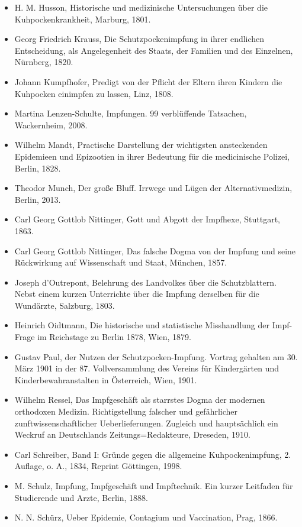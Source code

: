 \documentclass[
    a4paper,
    12pt,
    hyphens,
    chapterprefix=true,
    headheight=33pt,
    footheight=29pt,
    headings=optiontohead,
]{scrartcl}
\begin{document}
{\begin{itemize}
\item{H. M. Husson, Historische und medizinische Untersuchungen über die Kuhpockenkrankheit, Marburg, 1801.}
\item{Georg Friedrich Krauss, Die Schutzpockenimpfung in ihrer endlichen Entscheidung, als Angelegenheit des Staats, der Familien und des Einzelnen, Nürnberg, 1820.}
\item{Johann Kumpfhofer, Predigt von der Pflicht der Eltern ihren Kindern die Kuhpocken einimpfen zu lassen, Linz, 1808.}
\item{Martina Lenzen-Schulte, Impfungen. 99 verblüffende Tatsachen, Wackernheim, 2008.}
\item{Wilhelm Mandt, Practische Darstellung der wichtigsten ansteckenden Epidemieen und Epizootien in ihrer Bedeutung für die medicinische Polizei, Berlin, 1828.}
\item{Theodor Munch, Der große Bluff. Irrwege und Lügen der Alternativmedizin, Berlin, 2013.}
\item{Carl Georg Gottlob Nittinger, Gott und Abgott der Impfhexe, Stuttgart, 1863.}
\item{Carl Georg Gottlob Nittinger, Das falsche Dogma von der Impfung und seine Rückwirkung auf Wissenschaft und Staat, München, 1857.}
\item{Joseph d'Outrepont, Belehrung des Landvolkes über die Schutzblattern. Nebst einem kurzen Unterrichte über die Impfung derselben für die Wundärzte, Salzburg, 1803.}
\item{Heinrich Oidtmann, Die historische und statistische Misshandlung der Impf-Frage im Reichstage zu Berlin 1878, Wien, 1879.}
\item{Gustav Paul, der Nutzen der Schutzpocken-Impfung. Vortrag gehalten am 30. März 1901 in der 87. Vollversammlung des Vereins für Kindergärten und Kinderbewahranstalten in Österreich, Wien, 1901.}
\item{Wilhelm Ressel, Das Impfgeschäft als starrstes Dogma der modernen orthodoxen Medizin. Richtigstellung falscher und gefährlicher zunftwissenschaftlicher Ueberlieferungen. Zugleich und hauptsächlich ein Weckruf an Deutschlands Zeitungs=Redakteure, Dreseden, 1910.}
\item{Carl Schreiber, Band I: Gründe gegen die allgemeine Kuhpockenimpfung, 2. Auflage, o. A., 1834, Reprint Göttingen, 1998.}
\item{M. Schulz, Impfung, Impfgeschäft und Impftechnik. Ein kurzer Leitfaden für Studierende und Arzte, Berlin, 1888.}
\item{N. N. Schürz, Ueber Epidemie, Contagium und Vaccination, Prag, 1866.}

\end{itemize}}
\end{document}
